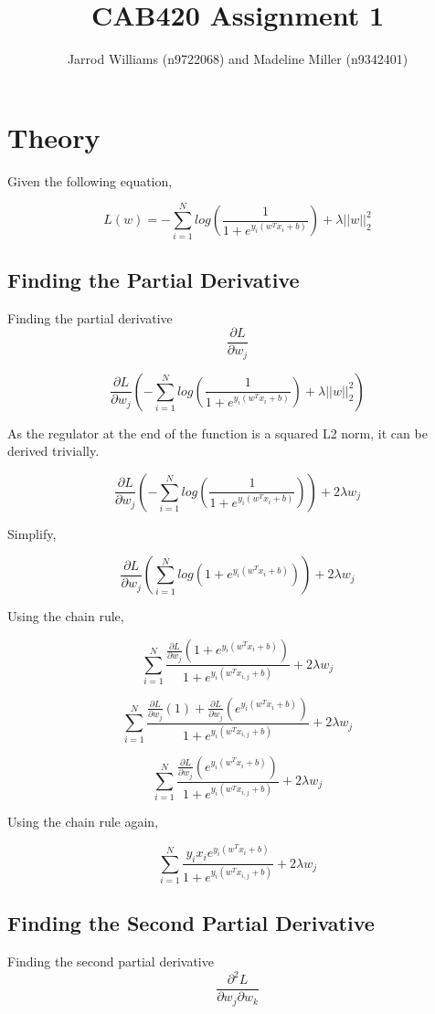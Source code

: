\documentclass[]{report}   %
\begin{document}
\title{CAB420 Assignment 1}   %
\author{Jarrod Williams (n9722068) and Madeline Miller (n9342401)}         %
\maketitle

\chapter{Theory}

Given the following equation,

$$L(w)=-\sum_{i=1}^{N}log(\frac{1}{1+e^{y_i(w^Tx_i+b)}})+\lambda||w||_2^2$$

\section{Finding the Partial Derivative}
Finding the partial derivative $$\frac{\partial L}{\partial w_j}$$

$$\frac{\partial L}{\partial w_j}(-\sum_{i=1}^{N}log(\frac{1}{1+e^{y_i(w^Tx_i+b)}})+\lambda||w||_2^2)$$

As the regulator at the end of the function is a squared L2 norm, it can be derived trivially.

$$\frac{\partial L}{\partial w_j}(-\sum_{i=1}^{N}log(\frac{1}{1+e^{y_i(w^Tx_i+b)}}))+2\lambda w_j$$

Simplify,

$$\frac{\partial L}{\partial w_j}(\sum_{i=1}^{N}log(1+e^{y_i(w^Tx_i+b)}))+2\lambda w_j$$

Using the chain rule,

$$\sum_{i=1}^{N}\frac{\frac{\partial L}{\partial w_j}(1+e^{y_i(w^Tx_i+b)})}{1+e^{y_i(w^Tx_{i,j}+b)}}+2\lambda w_j$$

$$\sum_{i=1}^{N}\frac{\frac{\partial L}{\partial w_j}(1)+\frac{\partial L}{\partial w_j}(e^{y_i(w^Tx_i+b)})}{1+e^{y_i(w^Tx_{i,j}+b)}}+2\lambda w_j$$

$$\sum_{i=1}^{N}\frac{\frac{\partial L}{\partial w_j}(e^{y_i(w^Tx_i+b)})}{1+e^{y_i(w^Tx_{i,j}+b)}}+2\lambda w_j$$

Using the chain rule again,

$$\sum_{i=1}^{N}\frac{y_ix_ie^{y_i(w^Tx_i+b)}}{1+e^{y_i(w^Tx_{i,j}+b)}}+2\lambda w_j$$

\section{Finding the Second Partial Derivative}
Finding the second partial derivative $$\frac{\partial^2 L}{\partial w_j\partial w_k}$$
\end{document}
